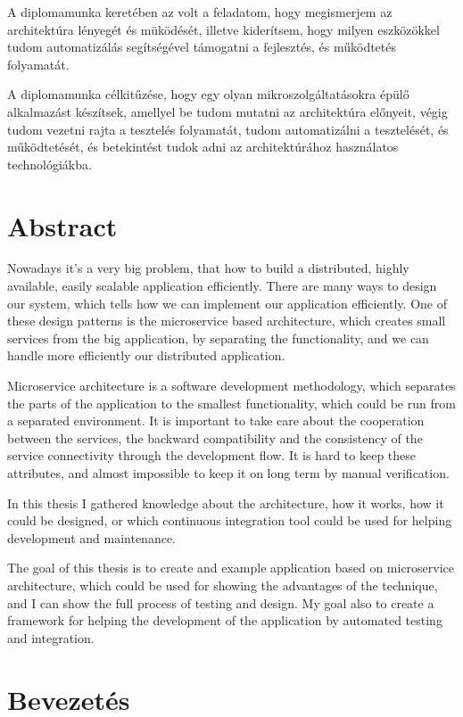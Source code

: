 \documentclass[11pt,magyar,a4paper,twoside,]{report}
\begin{document}
A diplomamunka keretében az volt a feladatom, hogy megismerjem az
architektúra lényegét és müködését, illetve kiderítsem, hogy milyen
eszközökkel tudom automatizálás segítségével támogatni a fejlesztés, és
működtetés folyamatát.

A diplomamunka célkitűzése, hogy egy olyan mikroszolgáltatásokra épülő
alkalmazást készítsek, amellyel be tudom mutatni az architektúra
előnyeit, végig tudom vezetni rajta a tesztelés folyamatát, tudom
automatizálni a tesztelését, és működtetését, és betekintést tudok adni
az architektúrához használatos technológiákba.

\chapter*{Abstract}\label{abstract}

Nowadays it's a very big problem, that how to build a distributed,
highly available, easily scalable application efficiently. There are
many ways to design our system, which tells how we can implement our
application efficiently. One of these design patterns is the
microservice based architecture, which creates small services from the
big application, by separating the functionality, and we can handle more
efficiently our distributed application.

Microservice architecture is a software development methodology, which
separates the parts of the application to the smallest functionality,
which could be run from a separated environment. It is important to take
care about the cooperation between the services, the backward
compatibility and the consistency of the service connectivity through
the development flow. It is hard to keep these attributes, and almost
impossible to keep it on long term by manual verification.

In this thesis I gathered knowledge about the architecture, how it
works, how it could be designed, or which continuous integration tool
could be used for helping development and maintenance.

The goal of this thesis is to create and example application based on
microservice architecture, which could be used for showing the
advantages of the technique, and I can show the full process of testing
and design. My goal also to create a framework for helping the
development of the application by automated testing and integration.

\chapter{Bevezetés}\label{bevezetuxe9s}
\end{document}
